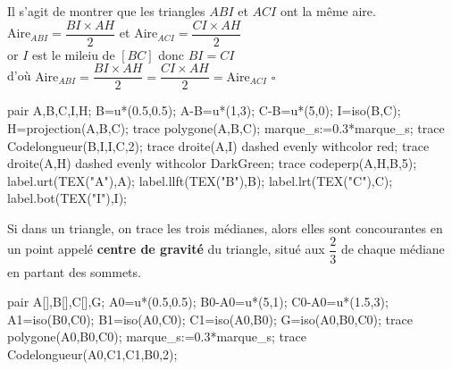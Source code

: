 \begin{changemargin}{0mm}{-15mm}
\begin{preuve}
        \begin{minipage}{0.6\linewidth}
            Il s'agit de montrer que les triangles $ABI$ et $ACI$ ont la même aire.\\
            $\text{Aire}_{ABI}=\dfrac{BI\times AH}{2}$ et $\text{Aire}_{ACI}=\dfrac{CI\times AH}{2}$\\
            or $I$ est le mileiu de $[BC]$ donc $BI=CI$ \\
            d'où $\text{Aire}_{ABI}=\dfrac{BI\times AH}{2}=\dfrac{CI\times AH}{2}=\text{Aire}_{ACI}$ $\square$
        \end{minipage}
        \begin{minipage}{0.4\linewidth}
            \begin{Geometrie}[CoinHD={(6.5u,4u)}]
                pair A,B,C,I,H;
                B=u*(0.5,0.5);
                A-B=u*(1,3);
                C-B=u*(5,0);
                I=iso(B,C);
                H=projection(A,B,C);
                trace polygone(A,B,C);
                marque_s:=0.3*marque_s;
                trace Codelongueur(B,I,I,C,2);
                trace droite(A,I) dashed evenly withcolor red;
                trace droite(A,H) dashed evenly withcolor DarkGreen;
                trace codeperp(A,H,B,5);
                label.urt(TEX("A"),A);
                label.llft(TEX("B"),B);
                label.lrt(TEX("C"),C);
                label.bot(TEX("I"),I);
            \end{Geometrie}
        \end{minipage}
    \end{preuve}
    \begin{minipage}{0.6\linewidth}
        \begin{propriete}
            Si dans un triangle, on trace les trois médianes, alors elles sont concourantes en un point appelé \textbf{centre de gravité} du triangle, situé aux $\dfrac23$ de chaque médiane en partant des sommets.
        \end{propriete}
    \end{minipage}
    \begin{minipage}{0.4\linewidth}
        \begin{Geometrie}[CoinHD={(6.5u,4u)}]
            pair A[],B[],C[],G;
            A0=u*(0.5,0.5);
            B0-A0=u*(5,1);
            C0-A0=u*(1.5,3);
            A1=iso(B0,C0);
            B1=iso(A0,C0);
            C1=iso(A0,B0);
            G=iso(A0,B0,C0);
            trace polygone(A0,B0,C0);
            marque_s:=0.3*marque_s;
            trace Codelongueur(A0,C1,C1,B0,2);

\end{Geometrie}
\end{minipage}
\end{changemargin}
